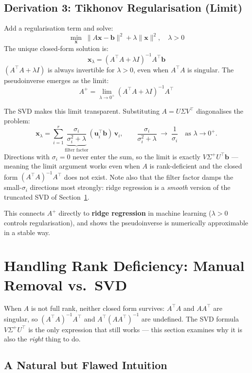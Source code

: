 \documentclass[12pt, a4paper]{article}
\theoremstyle{definition}
\begin{document}
\subsection{Derivation 3: Tikhonov Regularisation (Limit)}

Add a regularisation term and solve:
\[
    \min_{\mathbf{x}}\; \|A\mathbf{x} - \mathbf{b}\|^2 + \lambda\|\mathbf{x}\|^2, \quad \lambda > 0
\]
The unique closed-form solution is:
\[
    \mathbf{x}_\lambda = (A^\top A + \lambda I)^{-1} A^\top \mathbf{b}
\]
$(A^\top A + \lambda I)$ is always invertible for $\lambda > 0$, even when $A^\top A$ is singular. The pseudoinverse emerges as the limit:
\[
    A^+ = \lim_{\lambda \to 0^+} (A^\top A + \lambda I)^{-1} A^\top
\]

The SVD makes this limit transparent. Substituting $A = U\Sigma V^\top$ diagonalises the problem:
\[
    \mathbf{x}_\lambda = \sum_{i=1}^{r} \underbrace{\frac{\sigma_i}{\sigma_i^2 + \lambda}}_{\text{filter factor}} (\mathbf{u}_i^\top \mathbf{b})\, \mathbf{v}_i,
    \qquad
    \frac{\sigma_i}{\sigma_i^2 + \lambda} \;\longrightarrow\; \frac{1}{\sigma_i} \quad \text{as } \lambda \to 0^+.
\]
Directions with $\sigma_i = 0$ never enter the sum, so the limit is exactly $V\Sigma^+U^\top\mathbf{b}$ — meaning the limit argument works even when $A$ is rank-deficient and the closed form $(A^\top A)^{-1}A^\top$ does not exist. Note also that the filter factor damps the small-$\sigma_i$ directions most strongly: ridge regression is a \emph{smooth} version of the truncated SVD of Section~\ref{sec:rankdef}.

This connects $A^+$ directly to \textbf{ridge regression} in machine learning ($\lambda > 0$ controls regularisation), and shows the pseudoinverse is numerically approximable in a stable way.

\section{Handling Rank Deficiency: Manual Removal vs.\ SVD}
\label{sec:rankdef}

When $A$ is not full rank, neither closed form survives: $A^\top A$ and $AA^\top$ are singular, so $(A^\top A)^{-1}A^\top$ and $A^\top(AA^\top)^{-1}$ are undefined. The SVD formula $V\Sigma^+U^\top$ is the only expression that still works — this section examines why it is also the \emph{right} thing to do.

\subsection{A Natural but Flawed Intuition}
\end{document}
